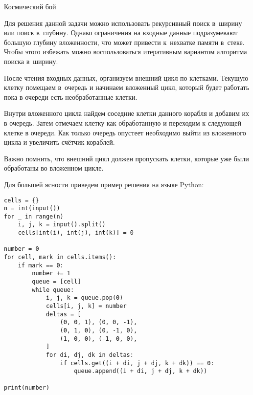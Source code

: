 \begin{tutorial}{Космический бой}

Для решения данной задачи можно использовать рекурсивный поиск в~ширину или поиск в~глубину. Однако ограничения на входные данные подразумевают большую глубину вложенности, что может привести к~нехватке памяти в~стеке. Чтобы этого избежать можно воспользоваться итеративным вариантом алгоритма поиска в~ширину.

После чтения входных данных, организуем внешний цикл по клетками. Текущую клетку помещаем в~очередь и начинаем вложенный цикл, который будет работать пока в очереди есть необработанные клетки.

Внутри вложенного цикла найдем соседние клетки данного корабля и добавим их в очередь. Затем отмечаем клетку как обработанную и переходим к следующей клетке в очереди. Как только очередь опустеет необходимо выйти из вложенного цикла и увеличить счётчик кораблей.

Важно помнить, что внешний цикл должен пропускать клетки, которые уже были обработаны во вложенном цикле.

Для большей ясности приведем пример решения на языке Python:

\begin{verbatim}
cells = {}
n = int(input())
for _ in range(n)
    i, j, k = input().split()
    cells[int(i), int(j), int(k)] = 0

number = 0
for cell, mark in cells.items():
    if mark == 0:
        number += 1
        queue = [cell]
        while queue:
            i, j, k = queue.pop(0)
            cells[i, j, k] = number
            deltas = [
                (0, 0, 1), (0, 0, -1),
                (0, 1, 0), (0, -1, 0),
                (1, 0, 0), (-1, 0, 0),
            ]
            for di, dj, dk in deltas:
                if cells.get((i + di, j + dj, k + dk)) == 0:
                    queue.append((i + di, j + dj, k + dk))

print(number)
\end{verbatim}


\end{tutorial}
